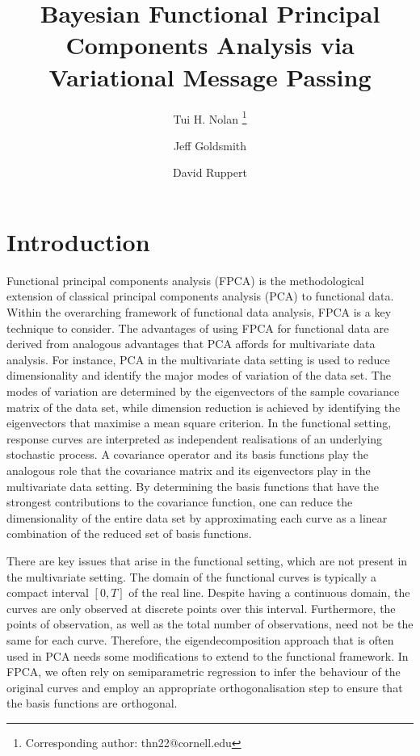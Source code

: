 \documentclass[12pt]{article}
\title{Bayesian Functional Principal Components Analysis via Variational Message Passing}
\author[1,2]{Tui H. Nolan \thanks{Corresponding author: thn22@cornell.edu}}
\author[3]{Jeff Goldsmith}
\author[1,4]{David Ruppert}
\affil[1]{School of Operations Research and Information Engineering, Cornell University}
\affil[2]{School of Mathematical and Physical Sciences, University of Technology Sydney}
\affil[3]{Mailman School of Public Health, Columbia University}
\affil[4]{School of Statistical Science, Cornell University}
\theoremstyle{plain}
\theoremstyle{definition}
\theoremstyle{remark}
\begin{document}
\maketitle


\section{Introduction}
\label{sec:intro}

Functional principal components analysis (FPCA) is the methodological extension of classical principal
components analysis (PCA) to functional data. Within the overarching framework of functional data analysis,
FPCA is a key technique to consider. The advantages of using FPCA for functional data are derived
from analogous advantages that PCA affords for multivariate data analysis. For instance, PCA in the multivariate
data setting is used to reduce dimensionality and identify the major modes of variation of the
data set. The modes of variation are determined by the eigenvectors of the sample covariance matrix of the data
set, while dimension reduction is achieved by identifying the eigenvectors that maximise a mean square criterion.
In the functional setting, response curves are interpreted as independent realisations of an underlying
stochastic process. A covariance operator and its basis functions play the analogous
role that the covariance matrix and its eigenvectors play in the multivariate data setting. By determining the
basis functions that have the strongest contributions to the covariance function, one can reduce the
dimensionality of the entire data set by approximating each curve as a linear combination of the reduced set
of basis functions.

There are key issues that arise in the functional setting, which are not present in the multivariate setting.
The domain of the functional curves is typically a compact interval $[0, T]$ of the real line.
Despite having a continuous domain, the curves are only observed at discrete points over this interval.
Furthermore, the points of observation, as well as the total number of observations, need not be the
same for each curve. Therefore, the eigendecomposition approach that is often used in PCA needs some
modifications to extend to the functional framework.
In FPCA, we often rely on semiparametric regression to infer the behaviour of the original curves and employ
an appropriate orthogonalisation step to ensure that the basis functions are orthogonal.
\end{document}
